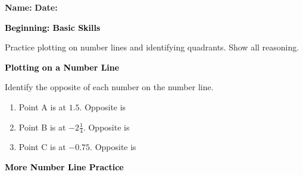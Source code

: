 \documentclass[12pt, letterpaper, fleqn]{article}
\newcommand{\blank}{\underline{\hspace{2.2cm}}}
\begin{document}
\textbf{Name:} \underline{\hspace{5cm}}
\hfill
\textbf{Date:} \underline{\hspace{3cm}}\\

\begin{tcolorbox}[colback=black!10]
    \large\textcolor{black}{\textbf{Beginning: Basic Skills}}
\end{tcolorbox}

\vspace{3mm}

\noindent
Practice plotting on number lines and identifying quadrants. Show all reasoning.

\vspace{4mm}

\begin{tcolorbox}[colback=black!10]
\large\textcolor{black}{\textbf{Plotting on a Number Line}}
\end{tcolorbox}

\noindent
Identify the opposite of each number on the number line.

\vspace{3mm}
\begin{enumerate}[itemsep=2.2cm, leftmargin=0.6cm]
\item Point A is at $1.5$. Opposite is \blank

\vspace{2cm}

\item Point B is at $-2\frac{1}{4}$. Opposite is \blank

\vspace{2cm}

\item Point C is at $-0.75$. Opposite is \blank

\vspace{2cm}

\end{enumerate}

\newpage

\begin{tcolorbox}[colback=black!10]
\large\textcolor{black}{\textbf{More Number Line Practice}}
\end{tcolorbox}
\end{document}
